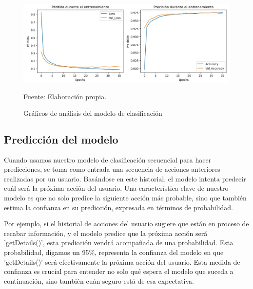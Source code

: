 \begin{figure}[H]
    \begin{minipage}[t]{0.9\textwidth}
        \caption{Gráficos de análisis del modelo de clasificación}
        \label{gráfico_clasificación}        
    \end{minipage}

    \vspace{10pt}

    \begin{minipage}[b]{1\textwidth}
        \centering
        \includegraphics[width=\textwidth]{img/Gráfico modelo clasificación.jpg}        
    \end{minipage}

    \begin{minipage}[t]{0.9\textwidth}
        Fuente: Elaboración propia.
    \end{minipage}
\end{figure}

\subsection{Predicción del modelo}

Cuando usamos nuestro modelo de clasificación secuencial para hacer predicciones, se toma como entrada una secuencia de acciones anteriores realizadas por un usuario. Basándose en este historial, el modelo intenta predecir cuál será la próxima acción del usuario. Una característica clave de nuestro modelo es que no solo predice la siguiente acción más probable, sino que también estima la confianza en su predicción, expresada en términos de probabilidad.

Por ejemplo, si el historial de acciones del usuario sugiere que están en proceso de recabar información, y el modelo predice que la próxima acción será 'getDetails()', esta predicción vendrá acompañada de una probabilidad. Esta probabilidad, digamos un 95\%, representa la confianza del modelo en que 'getDetails()' será efectivamente la próxima acción del usuario. Esta medida de confianza es crucial para entender no solo qué espera el modelo que suceda a continuación, sino también cuán seguro está de esa expectativa.

